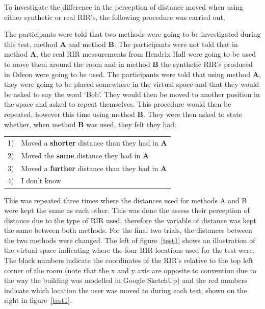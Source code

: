 \documentclass[../../main.tex]{subfiles}
\begin{document}
			To investigate the difference in the perception of distance moved when using either synthetic or real \ac{RIR}'s, the following procedure was carried out,


			The participants were told that two methods were going to be investigated during this test, method \textbf{A} and method \textbf{B}. The participants were not told that in method \textbf{A}, the real \ac{RIR} measurements from Hendrix Hall were going to be used to move them around the room and in method \textbf{B} the synthetic \ac{RIR}'s produced in Odeon were going to be used. The participants were told that using method \textbf{A}, they were going to be placed somewhere in the virtual space and that they would be asked to say the word `Bob'. They would then be moved to another position in the space and asked to repeat themselves. This procedure would then be repeated, however this time using method \textbf{B}. They were then asked to state whether, when method \textbf{B} was used, they felt they had:

			\vspace{5mm}
			\begin{center}
			    \begin{tabular}{l l}
			       1) & Moved a \textbf{shorter} distance than they had in \textbf{A}\\
			       2) & Moved the \textbf{same} distance they had in \textbf{A}\\
			       3) & Moved a \textbf{further} distance than they had in \textbf{A}\\
			       4) & I don't know\\
			    \end{tabular}
			\end{center}
			\vspace{5mm}

			This was repeated three times where the distances used for methods A and B were kept the same as each other. This was done the assess their perception of distance due to the type of \ac{RIR} used, therefore the variable of distance was kept the same between both methods. For the final two trials, the distances between the two methods were changed. The left of figure~\ref{test1} shows an illustration of the virtual space indicating where the four \ac{RIR} locations used for the test were. The black numbers indicate the coordinates of the \ac{RIR}'s  relative to the top left corner of the room (note that the x and y axis are opposite to convention due to the way the building was modelled in Google SketchUp) and the red numbers indicate which location the user was moved to during each test, shown on the right in figure~\ref{test1}.
\end{document}
